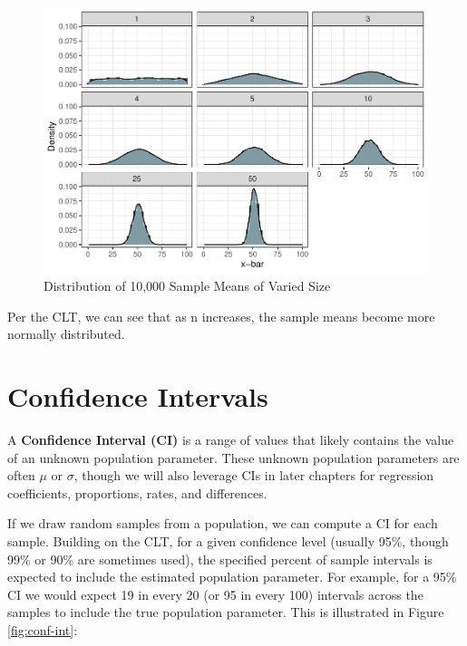 \documentclass[]{book}
\begin{document}
\begin{figure}

{\centering \includegraphics{The_People_Analytics_Companion_files/figure-latex/unnamed-chunk-92-1} 

}

\caption{Distribution of 10,000 Sample Means of Varied Size}\label{fig:unnamed-chunk-92}
\end{figure}

Per the CLT, we can see that as n increases, the sample means become more normally distributed.

\hypertarget{confidence-intervals}{%
\section{Confidence Intervals}\label{confidence-intervals}}

A \textbf{Confidence Interval (CI)} is a range of values that likely contains the value of an unknown population parameter. These unknown population parameters are often \(\mu\) or \(\sigma\), though we will also leverage CIs in later chapters for regression coefficients, proportions, rates, and differences.

If we draw random samples from a population, we can compute a CI for each sample. Building on the CLT, for a given confidence level (usually 95\%, though 99\% or 90\% are sometimes used), the specified percent of sample intervals is expected to include the estimated population parameter. For example, for a 95\% CI we would expect 19 in every 20 (or 95 in every 100) intervals across the samples to include the true population parameter. This is illustrated in Figure \ref{fig:conf-int}:
\end{document}
